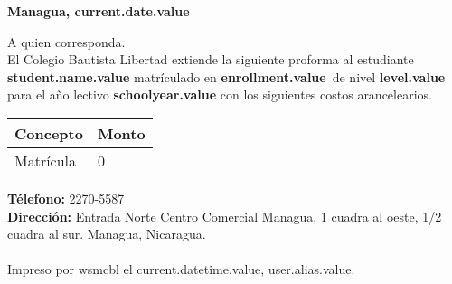\documentclass[12pt]{article}
\newcommand{\enrollmentName}{enrollment.value}
\newcommand{\levelName}{level.value}
\newcommand{\studentName}{student.name.value}
\newcommand{\schoolYear}{schoolyear.value}
\newcommand{\currentDate}{current.date.value}
\newcommand{\userAlias}{user.alias.value}
\newcommand{\currentDatetime}{current.datetime.value}
\begin{document}
    \hfill\textbf{Managua, \currentDate}

    A quien corresponda.\\

    El Colegio Bautista Libertad extiende la siguiente proforma al estudiante \textbf{\studentName}
    matrículado en \textbf{\enrollmentName}~de nivel \textbf{\levelName} para el año lectivo \textbf{\schoolYear}
    con los siguientes costos arancelearios.


    \begin{table}[H]
        \centering
        \begin{tabular}{|p{1.8cm}|p{2.3cm}|}
            \hline
            Concepto & Monto\\\hline\hline
            Matrícula & 0\\\hline      
        \end{tabular}
    \end{table}

    \textbf{Télefono:} 2270-5587\\
    \textbf{Dirección:} Entrada Norte Centro Comercial Managua, 1 cuadra al oeste, 1/2 cuadra al sur. Managua, Nicaragua.\\\\
    {\footnotesize Impreso por wsmcbl el \currentDatetime, \userAlias.}
\end{document}
